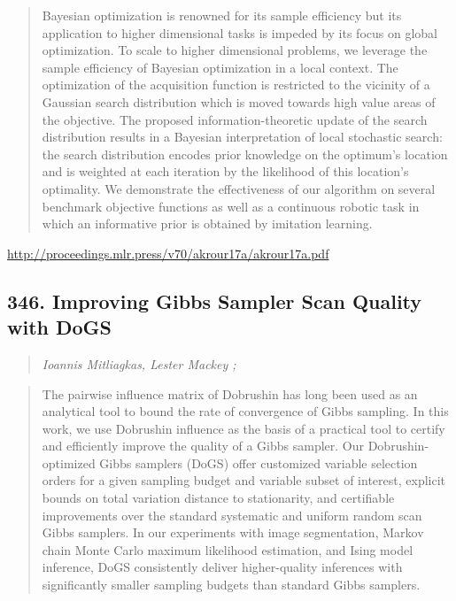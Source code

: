 \documentclass{article}
\begin{document}
\begin{quote}
    Bayesian optimization is renowned for its sample efficiency but its application to higher dimensional tasks is impeded by its focus on global optimization. To scale to higher dimensional problems, we leverage the sample efficiency of Bayesian optimization in a local context. The optimization of the acquisition function is restricted to the vicinity of a Gaussian search distribution which is moved towards high value areas of the objective. The proposed information-theoretic update of the search distribution results in a Bayesian interpretation of local stochastic search: the search distribution encodes prior knowledge on the optimum’s location and is weighted at each iteration by the likelihood of this location’s optimality. We demonstrate the effectiveness of our algorithm on several benchmark objective functions as well as a continuous robotic task in which an informative prior is obtained by imitation learning.  \end{quote}

\href{http://proceedings.mlr.press/v70/akrour17a/akrour17a.pdf}{http://proceedings.mlr.press/v70/akrour17a/akrour17a.pdf}

\subsection{346. Improving Gibbs Sampler Scan Quality with DoGS}

\begin{quote}
\footnotesize{\textit{Ioannis Mitliagkas, Lester Mackey ;}}
\end{quote}

\begin{quote}
    The pairwise influence matrix of Dobrushin has long been used as an analytical tool to bound the rate of convergence of Gibbs sampling. In this work, we use Dobrushin influence as the basis of a practical tool to certify and efficiently improve the quality of a Gibbs sampler. Our Dobrushin-optimized Gibbs samplers (DoGS) offer customized variable selection orders for a given sampling budget and variable subset of interest, explicit bounds on total variation distance to stationarity, and certifiable improvements over the standard systematic and uniform random scan Gibbs samplers. In our experiments with image segmentation, Markov chain Monte Carlo maximum likelihood estimation, and Ising model inference, DoGS consistently deliver higher-quality inferences with significantly smaller sampling budgets than standard Gibbs samplers.  \end{quote}
\end{document}
